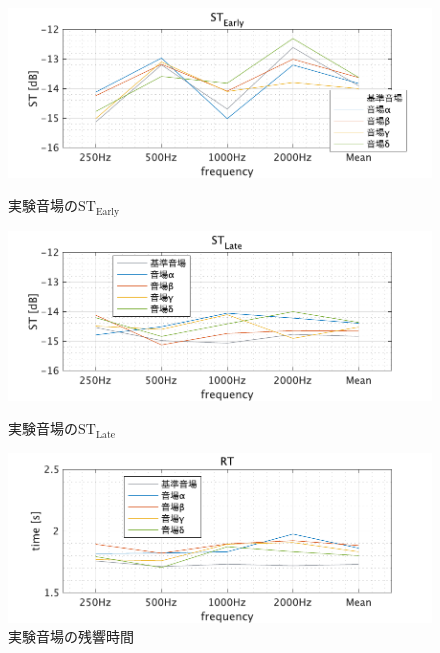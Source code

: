 \documentclass[11pt,a4j]{jreport}
\begin{document}
\begin{figure}[H]
  \begin{minipage}[b]{1\linewidth}
    \centering
    \includegraphics[width=.7\linewidth]{images/reproducedStRt/stEarlies.pdf}
    \caption{実験音場の$\mathrm{ST_{Early}}$}
    \label{fig:実験音場のSTEarly}
  \end{minipage}

  \vspace{1\baselineskip}

  \begin{minipage}[b]{1\linewidth}
    \centering
    \includegraphics[width=.7\linewidth]{images/reproducedStRt/stLates.pdf}
    \caption{実験音場の$\mathrm{ST_{Late}}$}
    \label{fig:実験音場のSTLate}
  \end{minipage}

  \vspace{1\baselineskip}
  
  \begin{minipage}[b]{1\linewidth}
    \centering
    \includegraphics[width=.7\linewidth]{images/reproducedStRt/rt.pdf}
    \caption{実験音場の残響時間}
    \label{fig:実験音場の残響時間}
  \end{minipage}
\end{figure}
\newpage
\end{document}
